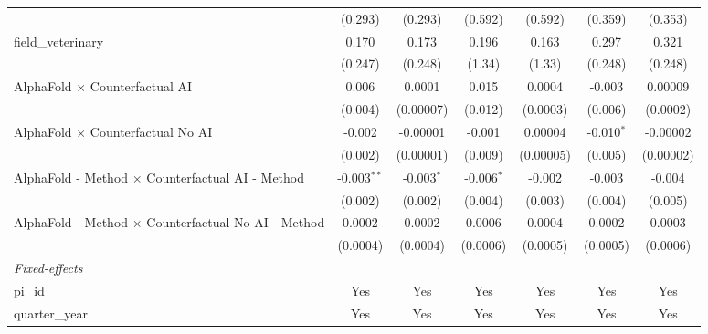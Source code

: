 \begin{tabular}{lcccccc}
                                                               & (0.293)        & (0.293)        & (0.592)        & (0.592)        & (0.359)        & (0.353)\\   
   field\_veterinary                                           & 0.170          & 0.173          & 0.196          & 0.163          & 0.297          & 0.321\\   
                                                               & (0.247)        & (0.248)        & (1.34)         & (1.33)         & (0.248)        & (0.248)\\   
   AlphaFold $\times$ Counterfactual AI                        & 0.006          & 0.0001         & 0.015          & 0.0004         & -0.003         & 0.00009\\   
                                                               & (0.004)        & (0.00007)      & (0.012)        & (0.0003)       & (0.006)        & (0.0002)\\   
   AlphaFold $\times$ Counterfactual No AI                     & -0.002         & -0.00001       & -0.001         & 0.00004        & -0.010$^{*}$   & -0.00002\\   
                                                               & (0.002)        & (0.00001)      & (0.009)        & (0.00005)      & (0.005)        & (0.00002)\\   
   AlphaFold - Method $\times$ Counterfactual AI - Method      & -0.003$^{**}$  & -0.003$^{*}$   & -0.006$^{*}$   & -0.002         & -0.003         & -0.004\\   
                                                               & (0.002)        & (0.002)        & (0.004)        & (0.003)        & (0.004)        & (0.005)\\   
   AlphaFold - Method $\times$ Counterfactual No AI - Method   & 0.0002         & 0.0002         & 0.0006         & 0.0004         & 0.0002         & 0.0003\\   
                                                               & (0.0004)       & (0.0004)       & (0.0006)       & (0.0005)       & (0.0005)       & (0.0006)\\   
   \midrule
   \emph{Fixed-effects}\\
   pi\_id                                                      & Yes            & Yes            & Yes            & Yes            & Yes            & Yes\\  
   quarter\_year                                               & Yes            & Yes            & Yes            & Yes            & Yes            & Yes\\  

\end{tabular}
